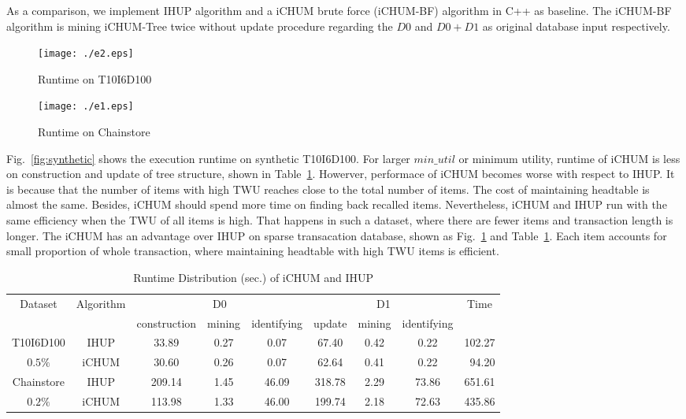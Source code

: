 \documentclass[runningheads,a4paper]{llncs}
\begin{document}
As a comparison, we implement IHUP algorithm and a iCHUM brute force (iCHUM-BF) algorithm in C++ as baseline. The iCHUM-BF algorithm is mining iCHUM-Tree twice without update procedure regarding the $ D0 $ and $ D0+D1 $ as original database input respectively.

\begin{figure}
\centering
\begin{minipage}[b]{0.48\textwidth}
\centering
\texttt{[image: ./e2.eps]}
\caption{Runtime on T10I6D100}
\label{fig:synthetic}
\end{minipage}
\begin{minipage}[b]{0.48\textwidth}
\centering
\texttt{[image: ./e1.eps]}
\caption{Runtime on Chainstore}
\label{fig:real}
\end{minipage}
\end{figure}

Fig.~\ref{fig:synthetic} shows the execution runtime on synthetic T10I6D100. For larger $ min\_util $ or minimum utility, runtime of iCHUM is less on construction and update of tree structure, shown in Table~\ref{table:4}. Howerver, performace of iCHUM becomes worse with respect to IHUP. It is because that the number of items with high TWU reaches close to the total number of items. The cost of maintaining headtable is almost the same. Besides, iCHUM should spend more time on finding back recalled items. Nevertheless, iCHUM and IHUP run with the same efficiency when the TWU of all items is high. That happens in such a dataset, where there are fewer items and transaction length is longer. The iCHUM has an advantage over IHUP on sparse transacation database, shown as Fig.~\ref{fig:real} and Table~\ref{table:4}. Each item accounts for small proportion of whole transaction, where maintaining headtable with high TWU items is efficient. 



\begin{table}
\centering
\caption{Runtime Distribution (sec.) of iCHUM and IHUP}
\begin{tabular}{c*{7}{c}r}
\hline
\multirow{2}[0]{*}{Dataset}  & \multicolumn{1}{c}{\multirow{2}[0]{*}{Algorithm}}  & \multicolumn{3}{c}{D0}  &\multicolumn{3}{c}{D1}  & \multicolumn{1}{c}{\multirow{2}[0]{*}{Time}} \\
 & \multicolumn{1}{c}{}  & construction & mining& identifying  & update & mining  & identifying & \multicolumn{1}{c}{}  \\
\hline
T10I6D100   & IHUP &  33.89 &  0.27     & 0.07  &    67.40   & 0.42      &  0.22     & 102.27 \\
$  0.5 \% $ & iCHUM &   30.60    &   0.26    &   0.07   &  62.64     &   0.41    &    0.22   & 94.20 \\
\hline
Chainstore & IHUP   &   209.14    &   1.45   &    46.09   &   318.78    &   2.29   &   73.86    & 651.61 \\
$ 0.2 \% $ & iCHUM &   113.98    &  1.33      &  46.00     &  199.74     &   2.18    &  72.63     & 435.86 \\
\hline
\end{tabular}
\label{table:4}
\end{table}
\end{document}
